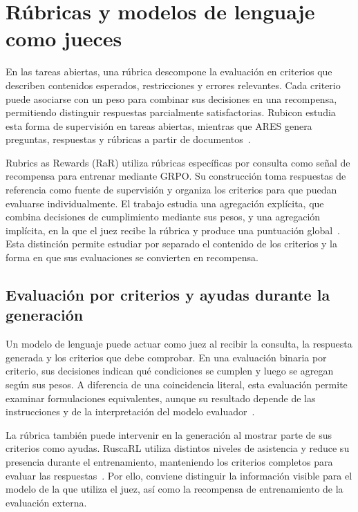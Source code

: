 \section{Rúbricas y modelos de lenguaje como jueces}
\label{sec:marco-rubricas}
En las tareas abiertas, una rúbrica descompone la evaluación en criterios que describen contenidos esperados, restricciones y errores relevantes. Cada criterio puede asociarse con un peso para combinar sus decisiones en una recompensa, permitiendo distinguir respuestas parcialmente satisfactorias. Rubicon estudia esta forma de supervisión en tareas abiertas, mientras que ARES genera preguntas, respuestas y rúbricas a partir de documentos~\cite{huang2025rubicon,li2026ares}.

Rubrics as Rewards (RaR) utiliza rúbricas específicas por consulta como señal de recompensa para entrenar mediante GRPO. Su construcción toma respuestas de referencia como fuente de supervisión y organiza los criterios para que puedan evaluarse individualmente. El trabajo estudia una agregación explícita, que combina decisiones de cumplimiento mediante sus pesos, y una agregación implícita, en la que el juez recibe la rúbrica y produce una puntuación global~\cite{gunjal2025rar}. Esta distinción permite estudiar por separado el contenido de los criterios y la forma en que sus evaluaciones se convierten en recompensa.

\subsection{Evaluación por criterios y ayudas durante la generación}
\label{sec:marco-jueces}
Un modelo de lenguaje puede actuar como juez al recibir la consulta, la respuesta generada y los criterios que debe comprobar. En una evaluación binaria por criterio, sus decisiones indican qué condiciones se cumplen y luego se agregan según sus pesos. A diferencia de una coincidencia literal, esta evaluación permite examinar formulaciones equivalentes, aunque su resultado depende de las instrucciones y de la interpretación del modelo evaluador~\cite{arora2025healthbench,zhou2026ruscarl}.

La rúbrica también puede intervenir en la generación al mostrar parte de sus criterios como ayudas. RuscaRL utiliza distintos niveles de asistencia y reduce su presencia durante el entrenamiento, manteniendo los criterios completos para evaluar las respuestas~\cite{zhou2026ruscarl}. Por ello, conviene distinguir la información visible para el modelo de la que utiliza el juez, así como la recompensa de entrenamiento de la evaluación externa.

%
